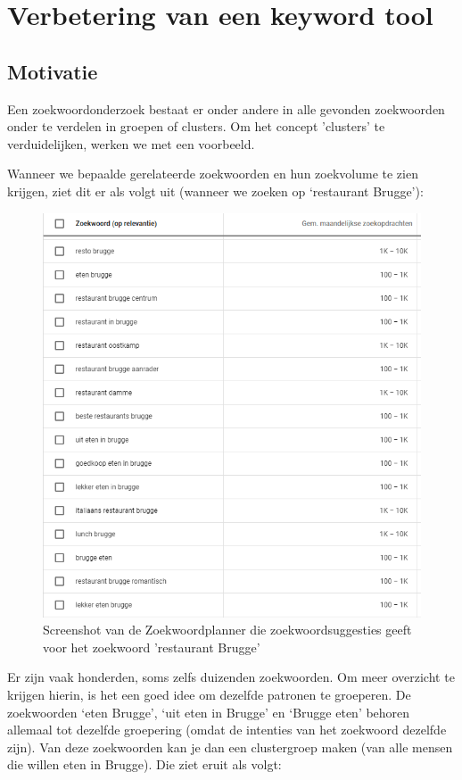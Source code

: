 \chapter{Verbetering van een keyword tool}
\label{ch:tool}

\section{Motivatie}
\label{ch: Motivatie}

Een zoekwoordonderzoek bestaat er onder andere in alle gevonden zoekwoorden onder te verdelen in groepen of clusters. Om het concept  'clusters' te verduidelijken, werken we met een voorbeeld.

Wanneer we bepaalde gerelateerde zoekwoorden en hun zoekvolume te zien krijgen, ziet dit er als volgt uit (wanneer we zoeken op ‘restaurant Brugge’): 

\begin{figure}[h!]
\centering
\includegraphics[width=\linewidth]{img/Keywordplannervoorbeeld.png}
\caption{Screenshot van de Zoekwoordplanner die zoekwoordsuggesties geeft voor het zoekwoord 'restaurant Brugge'}
\end{figure}

Er zijn vaak honderden, soms zelfs duizenden zoekwoorden. Om meer overzicht te krijgen hierin, is het een goed idee om dezelfde patronen te groeperen. De zoekwoorden ‘eten Brugge’, ‘uit eten in Brugge’ en ‘Brugge eten’ behoren allemaal tot dezelfde groepering (omdat de intenties van het zoekwoord dezelfde zijn). Van deze zoekwoorden kan je dan een clustergroep maken (van alle mensen die willen eten in Brugge). Die ziet eruit als volgt:

